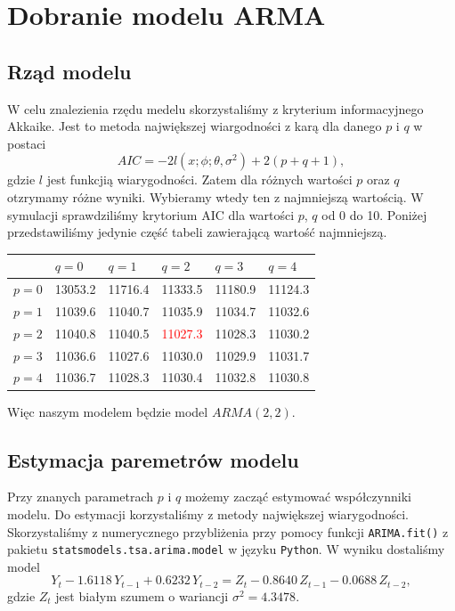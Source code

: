 \documentclass[12pt]{article}
\theoremstyle{exer}
\begin{document}
	\section{Dobranie modelu ARMA}
	\subsection{Rząd modelu}
	W celu znalezienia rzędu medelu skorzystaliśmy z kryterium informacyjnego Akkaike. Jest to metoda największej wiargodności z karą dla danego $p$ i $q$ w postaci
	\begin{equation}
		AIC=-2l(x;\phi;\theta,\sigma^2)+2(p+q+1),
	\end{equation}
	gdzie $l$ jest funkcjią wiarygodności. Zatem dla różnych wartości $p$ oraz $q$ otzrymamy różne wyniki. Wybieramy wtedy ten z najmniejszą wartością. W symulacji sprawdziliśmy krytorium AIC dla wartości $p$, $q$ od 0 do 10. Poniżej przedstawiliśmy jedynie część tabeli zawierającą wartość najmniejszą.
	\begin{table}[H]
		\centering
		\begin{tabularx}{4\textwidth/5}{|Y|Y|Y|Y|Y|Y|}
			\hline
			& $q=0$ & $q=1$ & $q=2$ & $q=3$ & $q=4$ \\\hline
			$p=0$ & 13053.2 & 11716.4 & 11333.5 & 11180.9 & 11124.3 \\\hline
			$p=1$ & 11039.6 & 11040.7 & 11035.9 & 11034.7 & 11032.6 \\\hline
			$p=2$ & 11040.8 & 11040.5 & \textcolor{red}{11027.3} & 11028.3 & 11030.2 \\\hline
			$p=3$ & 11036.6 & 11027.6 & 11030.0 & 11029.9 & 11031.7 \\\hline
			$p=4$ & 11036.7 & 11028.3 & 11030.4 & 11032.8 & 11030.8 \\\hline
		\end{tabularx}
	\end{table}
Więc naszym modelem będzie model $ARMA(2,2)$.
	\subsection{Estymacja paremetrów modelu}
	Przy znanych parametrach $p$ i $q$ możemy zacząć estymować współczynniki modelu. Do estymacji korzystaliśmy z metody największej wiarygodności. Skorzystaliśmy z numerycznego przybliżenia przy pomocy funkcji \verb*|ARIMA.fit()| z pakietu \verb*|statsmodels.tsa.arima.model| w języku \verb*|Python|. W wyniku dostaliśmy model
	\begin{equation}\label{model}
		Y_t-1.6118\,Y_{t-1}+0.6232\,Y_{t-2}=Z_t-0.8640\,Z_{t-1}-0.0688\,Z_{t-2},
	\end{equation}
     gdzie $Z_t$ jest białym szumem o wariancji $\sigma^2=4.3478$.
	
\end{document}
